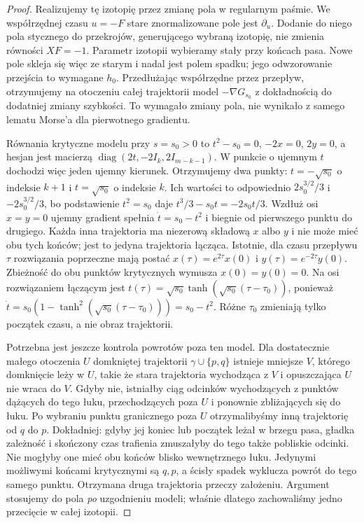 \begin{proof}
Realizujemy tę izotopię przez zmianę pola w regularnym paśmie.
We współrzędnej czasu $u=-F$ stare znormalizowane pole
jest $\partial_u$. Dodanie do niego pola stycznego
do przekrojów, generującego wybraną izotopię,
nie zmienia równości $XF=-1$.
Parametr izotopii wybieramy stały przy końcach pasa.
Nowe pole skleja się więc ze starym i nadal jest polem
spadku; jego odwzorowanie przejścia to wymagane $h_0$.
Przedłużając współrzędne przez przepływ, otrzymujemy
na otoczeniu całej trajektorii model $-\nabla G_{s_0}$
z dokładnością do dodatniej zmiany szybkości.
To wymagało zmiany pola, nie wynikało z samego
lematu Morse'a dla pierwotnego gradientu.

Równania krytyczne modelu przy $s=s_0>0$ to
$t^2-s_0=0$, $-2x=0$, $2y=0$, a hesjan jest macierzą
$\operatorname{diag}(2t,-2I_k,2I_{m-k-1})$.
W punkcie o ujemnym $t$ dochodzi więc jeden ujemny kierunek.
Otrzymujemy dwa punkty:
$t=-\sqrt{s_0}$ o indeksie $k+1$
i $t=\sqrt{s_0}$ o indeksie $k$.
Ich wartości to odpowiednio $2s_0^{3/2}/3$ i $-2s_0^{3/2}/3$,
bo podstawienie $t^2=s_0$ daje $t^3/3-s_0t=-2s_0t/3$.
Wzdłuż osi $x=y=0$ ujemny gradient
spełnia $\dot t=s_0-t^2$ i biegnie
od pierwszego punktu do drugiego.
Każda inna trajektoria ma niezerową
składową $x$ albo $y$ i nie może mieć
obu tych końców; jest to jedyna
trajektoria łącząca.
Istotnie, dla czasu przepływu $\tau$ rozwiązania poprzeczne
mają postać $x(\tau)=e^{2\tau}x(0)$ i
$y(\tau)=e^{-2\tau}y(0)$. Zbieżność do obu punktów krytycznych
wymusza $x(0)=y(0)=0$. Na osi rozwiązaniem łączącym jest
$t(\tau)=\sqrt{s_0}\tanh(\sqrt{s_0}(\tau-\tau_0))$,
ponieważ $\dot t=s_0(1-\tanh^2(\sqrt{s_0}(\tau-\tau_0)))
=s_0-t^2$. Różne $\tau_0$ zmieniają
tylko początek czasu, a nie obraz trajektorii.

Potrzebna jest jeszcze kontrola powrotów poza ten model.
Dla dostatecznie małego otoczenia $U$ domkniętej trajektorii
$\gamma\cup\{p,q\}$ istnieje mniejsze $V$, którego domknięcie
leży w $U$, takie że stara trajektoria wychodząca z $V$
i opuszczająca $U$ nie wraca do $V$.
Gdyby nie, istniałby ciąg odcinków wychodzących
z punktów dążących do tego łuku, przechodzących poza $U$
i ponownie zbliżających się do łuku.
Po wybraniu punktu granicznego poza $U$ otrzymalibyśmy
inną trajektorię od $q$ do $p$.
Dokładniej: gdyby jej koniec lub początek leżał
w brzegu pasa, gładka zależność i skończony czas
trafienia zmuszałyby do tego także pobliskie odcinki.
Nie mogłyby one mieć obu końców blisko wewnętrznego łuku.
Jedynymi możliwymi końcami krytycznymi są $q,p$,
a ścisły spadek wyklucza powrót do tego samego punktu.
Otrzymana druga trajektoria przeczy założeniu.
Argument stosujemy do pola \emph{po} uzgodnieniu modeli;
właśnie dlatego zachowaliśmy jedno przecięcie w całej izotopii.


\end{proof}
